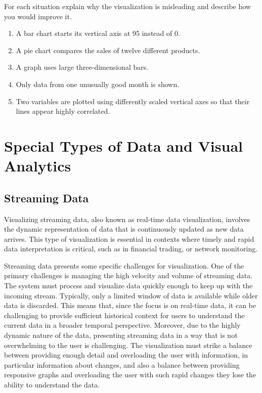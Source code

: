 \begin{exerciseboxpaper}
For each situation explain why the visualization is misleading and describe how you would improve it.

\begin{enumerate}
\item A bar chart starts its vertical axis at 95 instead of 0.
\item A pie chart compares the sales of twelve different products.
\item A graph uses large three-dimensional bars.
\item Only data from one unusually good month is shown.
\item Two variables are plotted using differently scaled vertical axes so that their lines appear highly correlated.
\end{enumerate}
\end{exerciseboxpaper}


\section{Special Types of Data and Visual Analytics}

\subsection*{Streaming Data}

Visualizing streaming data, also known as real-time data visualization, involves the dynamic representation of data that is continuously updated as new data arrives. This type of visualization is essential in contexts where timely and rapid data interpretation is critical, such as in financial trading, or network monitoring. 

Streaming data presents some specific challenges for visualization. One of the primary challenges is managing the high velocity and volume of streaming data. The system must process and visualize data quickly enough to keep up with the incoming stream. Typically, only a limited window of data is available while older data is discarded. This means that, since the focus is on real-time data, it can be challenging to provide sufficient historical context for users to understand the current data in a broader temporal perspective. Moreover, due to the highly dynamic nature of the data, presenting streaming data in a way that is not overwhelming to the user is challenging. The visualization must strike a balance between providing enough detail and overloading the user with information, in particular information about changes, and also a balance between providing responsive graphs and overloading the user with such rapid changes they lose the ability to understand the data.

